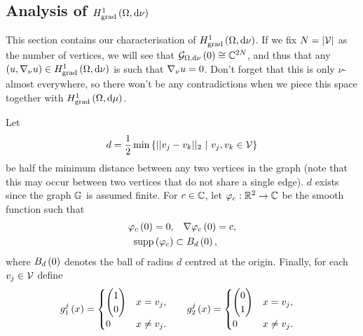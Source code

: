 \subsection{Analysis of $H^1_\mathrm{grad}\left( \Omega, \mathrm{d}\nu \right)$} \label{sec:PointMassSpaceAnalysis}
This section contains our characterisation of $H^1_\mathrm{grad}\left( \Omega, \mathrm{d}\nu \right)$.
If we fix $N = \left\lvert \mathcal{V} \right\rvert$ as the number of vertices, we will see that $\mathcal{G}_{ \Omega, \mathrm{d}\nu}\left( 0 \right) \cong \mathbb{C}^{2N}$, and thus that any $\left( u,\nabla_{\nu}u \right)\in H^1_\mathrm{grad}\left( \Omega, \mathrm{d}\nu \right)$ is such that $\nabla_{\nu}u=0$.
Don't forget that this is only $\nu$-almost everywhere, so there won't be any contradictions when we piece this space together with $H^1_\mathrm{grad}\left( \Omega, \mathrm{d}\mu \right)$.

\begin{definition} \label{def:UsefulObjects}
	Let 
	\begin{align*}
		d=\recip{2}\min\clbracs{\norm{v_j-v_k}_2 \ \vert \ v_j,v_k\in\vertSet}
	\end{align*}
	be half the minimum distance between any two vertices in the graph (note that this may occur between two vertices that do not share a single edge).
	$d$ exists since the graph $\mathbb{G}$ is assumed finite.
	For $c\in\mathbb{C}$, let $\varphi_c:\mathbb{R}^2\rightarrow\mathbb{C}$ be the smooth function such that
	\begin{align*}
		\varphi_c\left( 0 \right) = 0, &\quad \nabla\varphi_c\left( 0 \right) = c, \\
		\mathrm{supp}\left( \varphi_c \right) &\subset B_{d}\left( 0 \right),
	\end{align*}
	where $B_{d}\left( 0 \right)$ denotes the ball of radius $d$ centred at the origin.
	Finally, for each $v_j\in\mathcal{V}$ define
	\begin{align*}
		g^j_1\left( x \right) &=
		\begin{cases}
			\begin{pmatrix} 1 \\ 0 \end{pmatrix} & x=v_j, \\
			0 & x\neq v_j. \\
		\end{cases}
		&\quad
		g^j_2\left( x \right) &=
		\begin{cases}
			\begin{pmatrix} 0 \\ 1 \end{pmatrix} & x=v_j, \\
			0 & x\neq v_j. \\
		\end{cases}
	\end{align*}
\end{definition}

